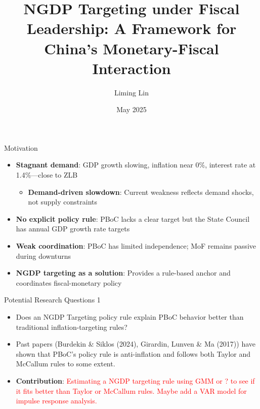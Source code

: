 \documentclass{beamer}
\title{NGDP Targeting under Fiscal Leadership: A Framework for China's Monetary-Fiscal Interaction}
\author{Liming Lin}
\institute{Sciences Po Paris}
\date{May 2025}
\begin{document}
\begin{frame}
  \titlepage
\end{frame}

\begin{frame}{Motivation}
  \begin{itemize}
    \item \textbf{Stagnant demand}: GDP growth slowing, inflation near 0\%, interest rate at 1.4\%—close to ZLB
    \begin{itemize}
     \item \textbf{Demand-driven slowdown}: Current weakness reflects demand shocks, not supply constraints
    \end{itemize}

    \item \textbf{No explicit policy rule}: PBoC lacks a clear target but the State Council has annual GDP growth rate targets
    \item \textbf{Weak coordination}: PBoC has limited independence; MoF remains passive during downturns
    \item \textbf{NGDP targeting as a solution}: Provides a rule-based anchor and coordinates fiscal-monetary policy
  \end{itemize}
\end{frame}

\begin{frame}{Potential Research Questions 1}
  \begin{itemize}
    \item Does an NGDP Targeting policy rule explain PBoC behavior better than traditional inflation-targeting rules?
    \item Past papers (Burdekin \& Siklos (2024), Girardin, Lunven \& Ma (2017)) have shown that PBoC's policy rule is anti-inflation and follows both Taylor and McCallum rules to some extent.
    \item \textbf{Contribution}: \textcolor{red}{Estimating a NGDP targeting rule using GMM or ? to see if it fits better than Taylor or McCallum rules. Maybe add a VAR model for impulse response analysis.}
  \end{itemize}
\end{frame}
\end{document}

